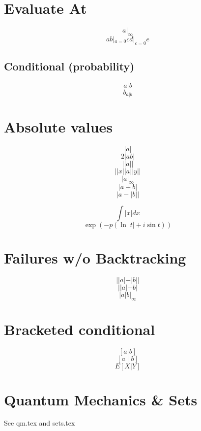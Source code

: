 \documentclass{article}
\begin{document}
%
%
%
%
%
%

\section{Evaluate At}
\[  a |_\infty \]
\[ a b |_{a=0} c d |_{c=0} e \]

\subsection{Conditional (probability)}
\[ a|b \]
\[ b_{a|b} \]

\section{Absolute values}
\[  |a| \]
\[ 2|ab| \] %
\[ ||a|| \]
\[ || x || a || y || \] %
\[  |a |_\infty \]
\[  |a + b| \]
\[  |a - |b|| \]

\[ \int |x| dx \]
\[ \exp (-p(\ln|t|+i\sin t)) \]

\section{Failures w/o Backtracking}
\[  ||a| - |b|| \]
\[ ||a|-b| \]
\[  |a | b |_\infty \]

\section{Bracketed conditional}
\[ [a|b] \]
\[ [a \mid b] \]
\[ E[X|Y] \]

\section{Quantum Mechanics \& Sets}
See qm.tex and sets.tex
\end{document}
